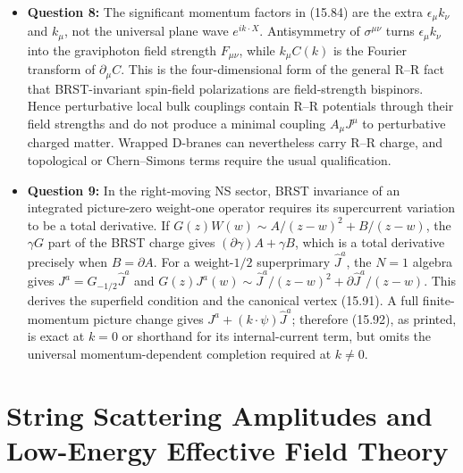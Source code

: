 \documentclass[
  10pt,
  a4paper,
  openany]{book}
\begin{document}
\begin{itemize}
  contributes \(-\alpha'm^2/4\) to each chirality. The book packages the
  two chiral weight conditions as \(m^2=m_L^2+m_R^2\), while level
  matching gives \(m_L^2=m_R^2=m^2/2\) for a physical closed-string
  state.
\item
  \textbf{Question 8:} The significant momentum factors in (15.84) are
  the extra \(\epsilon_\mu k_\nu\) and \(k_\mu\), not the universal
  plane wave \(e^{ik\cdot X}\). Antisymmetry of \(\sigma^{\mu\nu}\)
  turns \(\epsilon_\mu k_\nu\) into the graviphoton field strength
  \(F_{\mu\nu}\), while \(k_\mu C(k)\) is the Fourier transform of
  \(\partial_\mu C\). This is the four-dimensional form of the general
  R--R fact that BRST-invariant spin-field polarizations are
  field-strength bispinors. Hence perturbative local bulk couplings
  contain R--R potentials through their field strengths and do not
  produce a minimal coupling \(A_\mu J^\mu\) to perturbative charged
  matter. Wrapped D-branes can nevertheless carry R--R charge, and
  topological or Chern--Simons terms require the usual qualification.
\item
  \textbf{Question 9:} In the right-moving NS sector, BRST invariance of
  an integrated picture-zero weight-one operator requires its
  supercurrent variation to be a total derivative. If
  \(G(z)W(w)\sim A/(z-w)^2+B/(z-w)\), the \(\gamma G\) part of the BRST
  charge gives \((\partial\gamma)A+\gamma B\), which is a total
  derivative precisely when \(B=\partial A\). For a weight-\(1/2\)
  superprimary \(\hat J^a\), the \(N=1\) algebra gives
  \(J^a=G_{-1/2}\hat J^a\) and
  \(G(z)J^a(w)\sim\hat J^a/(z-w)^2+\partial\hat J^a/(z-w)\). This
  derives the superfield condition and the canonical vertex (15.91). A
  full finite-momentum picture change gives
  \(J^a+(k\cdot\psi)\hat J^a\); therefore (15.92), as printed, is exact
  at \(k=0\) or shorthand for its internal-current term, but omits the
  universal momentum-dependent completion required at \(k\neq0\).
\end{itemize}

\section{String Scattering Amplitudes and Low-Energy Effective Field
Theory}\label{string-scattering-amplitudes-and-low-energy-effective-field-theory}
\end{document}
